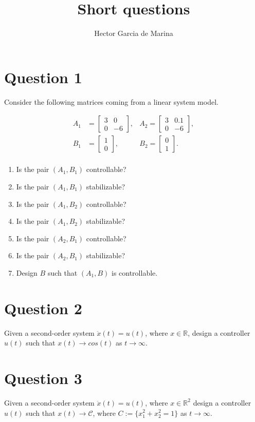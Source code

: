 \documentclass[11pt,a4paper,titlepage]{article}
\title{Short questions}
\author{Hector Garcia de Marina}
\begin{document}
\maketitle
\section{Question 1}
Consider the following matrices coming from a linear system model.

\begin{align}
	A_1 &= \begin{bmatrix}3 & 0 \\ 0 & -6\end{bmatrix}, &A_2 = \begin{bmatrix}3 & 0.1 \\ 0 & -6\end{bmatrix}, \nonumber \\
		B_1 &= \begin{bmatrix}1 \\ 0\end{bmatrix}, & B_2 = \begin{bmatrix}0 \\ 1\end{bmatrix}. \nonumber \\
\end{align}

\begin{enumerate}
\item Is the pair $(A_1, B_1)$ controllable?
\item Is the pair $(A_1, B_1)$ stabilizable?
\item Is the pair $(A_1, B_2)$ controllable?
\item Is the pair $(A_1, B_2)$ stabilizable?
\item Is the pair $(A_2, B_1)$ controllable?
\item Is the pair $(A_2, B_1)$ stabilizable?
\item Design $B$ such that $(A_1, B)$ is controllable.
\end{enumerate}

\section{Question 2}
Given a second-order system $\ddot x(t) = u(t)$, where $x\in\mathbb{R}$, design a controller $u(t)$ such that $x(t) \to cos(t)$ as $t\to\infty$.

\section{Question 3}
Given a second-order system $\ddot x(t) = u(t)$, where $x\in\mathbb{R}^2$ design a controller $u(t)$ such that $x(t) \to \mathcal{C}$, where $C := \{x_1^2 + x_2^2 = 1\}$ as $t\to\infty$.
\end{document}
